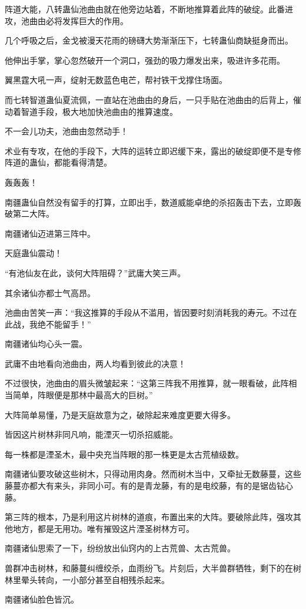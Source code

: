 \begin{this_body}
阵道大能，八转蛊仙池曲由就在他旁边站着，不断地推算着此阵的破绽。此番进攻，池曲由必将发挥巨大的作用。

几个呼吸之后，金戈被漫天花雨的磅礴大势渐渐压下，七转蛊仙商缺挺身而出。

他伸出手掌，掌心忽然破开一个洞口，强劲的吸力爆发出来，吸进许多花雨。

翼黑霆大吼一声，绽射无数蓝色电芒，帮衬铁干戈撑住场面。

而七转智道蛊仙夏流佩，一直站在池曲由的身后，一只手贴在池曲由的后背上，催动着智道手段，极大地加快池曲由的推算速度。

不一会儿功夫，池曲由忽然动手！

术业有专攻，在他的手段下，大阵的运转立即迟缓下来，露出的破绽即便不是专修阵道的蛊仙，都能看得清楚。

轰轰轰！

南疆蛊仙自然没有留手的打算，立即出手，数道威能卓绝的杀招轰击下去，立即轰破第二大阵。

南疆诸仙迈进第三阵中。

天庭蛊仙震动！

“有池仙友在此，谈何大阵阻碍？”武庸大笑三声。

其余诸仙亦都士气高昂。

池曲由苦笑一声：“我这推算的手段从不滥用，皆因要时刻消耗我的寿元。不过在此战，我绝不能留手！”

南疆诸仙均心头一震。

武庸不由地看向池曲由，两人均看到彼此的决意！

不过很快，池曲由的眉头微皱起来：“这第三阵我不用推算，就一眼看破，此阵相当简单，阵眼便是那林中最高大的巨树。”

大阵简单易懂，乃是天庭故意为之，破除起来难度更要大得多。

皆因这片树林非同凡响，能湮灭一切杀招威能。

每一株都是湮圣木，最中央充当阵眼的那一株更是太古荒植级数。

南疆诸仙要攻破这些树木，只得动用肉身。然而树木当中，又牵扯无数藤蔓，这些藤蔓亦都大有来头，非同小可。有的是青龙藤，有的是电绞藤，有的是锯齿钻心藤。

第三阵的根本，乃是利用这片树林的道痕，布置出来的大阵。要破除此阵，强攻其他地方，都是无用功。唯有摧毁这片湮圣树林方可。

南疆诸仙思索了一下，纷纷放出仙窍内的上古荒兽、太古荒兽。

兽群冲击树林，和藤蔓纠缠绞杀，血雨纷飞。片刻后，大半兽群牺牲，剩下的在树林里晕头转向，一小部分甚至自相残杀起来。

南疆诸仙脸色皆沉。


\end{this_body}
